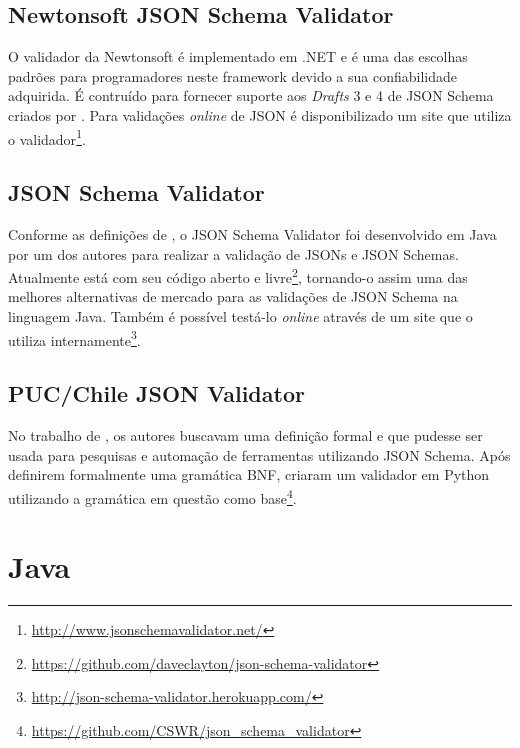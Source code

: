 \subsection{Newtonsoft JSON Schema Validator}

O validador da Newtonsoft é implementado em .NET \cite{NEWTONSOFT} e é uma das escolhas padrões para programadores neste framework devido a sua confiabilidade adquirida. É contruído para fornecer suporte aos \textit{Drafts} 3 e 4 de JSON Schema criados por . Para validações \textit{online} de JSON é disponibilizado um site que utiliza o validador\footnote{\url{http://www.jsonschemavalidator.net/}}.

\subsection{JSON Schema Validator}

Conforme as definições de , o JSON Schema Validator foi desenvolvido em Java por um dos autores para realizar a validação de JSONs e JSON Schemas. Atualmente está com seu código aberto e livre\footnote{\url{https://github.com/daveclayton/json-schema-validator}}, tornando-o assim uma das melhores alternativas de mercado para as validações de JSON Schema na linguagem Java. Também é possível testá-lo \textit{online} através de um site que o utiliza internamente\footnote{\url{http://json-schema-validator.herokuapp.com/}}.


\subsection{PUC/Chile JSON Validator}

No trabalho de , os autores buscavam uma definição formal e que pudesse ser usada para pesquisas e automação de ferramentas utilizando JSON Schema. Após definirem formalmente uma gramática BNF, criaram um validador em Python utilizando a gramática em questão como base\footnote{\url{https://github.com/CSWR/json_schema_validator}}.


\section{Java}

